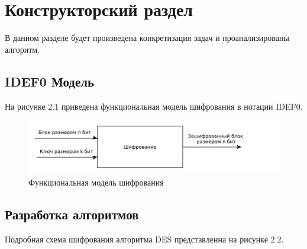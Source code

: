 
\chapter{Конструкторский раздел}
\label{cha:design}

В данном разделе будет произведена конкретизация задач и проанализированы алгоритм.

\section{IDEF0 Модель}

На рисунке 2.1 приведена функциональная модель шифрования в нотации IDEF0.
\begin{figure}[H]
\centering
\includegraphics[scale=0.75]{./pict/ideftr.pdf}
\caption{Функциональная модель шифрования}
\end{figure}
\newpage

\section{Разработка алгоритмов}
Подробная схема шифрования алгоритма DES представленна на рисунке 2.2.

